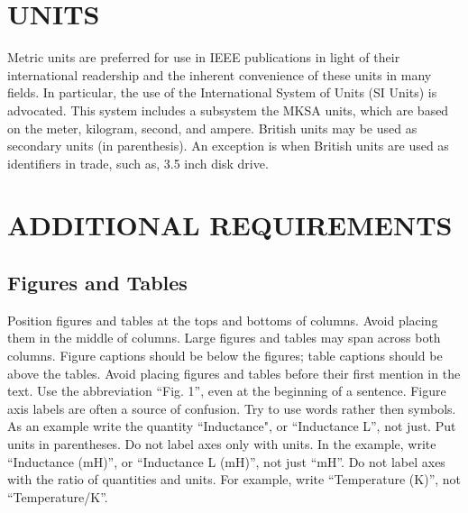 \documentclass[a4paper, 10pt, conference]{ieeeconf}      %
\begin{document}
\section{UNITS}

Metric units are preferred for use in IEEE publications in light of their
international readership and the inherent convenience of these units in many fields.
In particular, the use of the International System of Units (SI Units) is advocated.
 This system includes a subsystem the MKSA units, which are based on the
 meter, kilogram, second, and ampere. British units may be used as secondary units
 (in parenthesis). An exception is when British units are used as identifiers in trade,
 such as, 3.5 inch disk drive.


\addtolength{\textheight}{-3cm}   %

\section{ADDITIONAL REQUIREMENTS}

\subsection{Figures and Tables}

Position figures and tables at the tops and bottoms of columns.
Avoid placing them in the middle of columns. Large figures and tables
may span across both columns. Figure captions should be below the figures;
 table captions should be above the tables. Avoid placing figures and tables
  before their first mention in the text. Use the abbreviation ``Fig. 1'',
  even at the beginning of a sentence.
Figure axis labels are often a source of confusion.
Try to use words rather then symbols. As an example write the quantity ``Inductance",
 or ``Inductance L'', not just.
 Put units in parentheses. Do not label axes only with units.
 In the example, write ``Inductance (mH)'', or ``Inductance L (mH)'', not just ``mH''.
 Do not label axes with the ratio of quantities and units.
 For example, write ``Temperature (K)'', not ``Temperature/K''.
\end{document}
